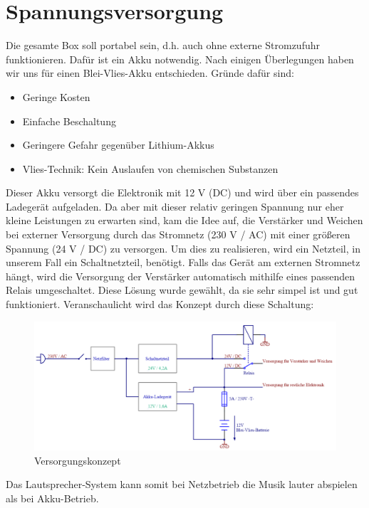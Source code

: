 \section{Spannungsversorgung}\label{sec:3.4}
Die gesamte Box soll portabel sein, d.h. auch ohne externe Stromzufuhr funktionieren.
Dafür ist ein Akku notwendig.
Nach einigen Überlegungen haben wir uns für einen Blei-Vlies-Akku entschieden.
Gründe dafür sind:
\begin{itemize}
	\item Geringe Kosten
	\item Einfache Beschaltung
	\item Geringere Gefahr gegenüber Lithium-Akkus
	\item Vlies-Technik: Kein Auslaufen von chemischen Substanzen
\end{itemize}
Dieser Akku versorgt die Elektronik mit 12 V (DC) und wird über ein passendes Ladegerät aufgeladen.
Da aber mit dieser relativ geringen Spannung nur eher kleine Leistungen zu erwarten sind, kam die Idee auf, die Verstärker und Weichen bei externer Versorgung durch das Stromnetz (230 V / AC) mit einer größeren Spannung (24 V / DC) zu versorgen.
Um dies zu realisieren, wird ein Netzteil, in unserem Fall ein Schaltnetzteil, benötigt.
Falls das Gerät am externen Stromnetz hängt, wird die Versorgung der Verstärker automatisch mithilfe eines passenden Relais umgeschaltet.
Diese Lösung wurde gewählt, da sie sehr simpel ist und gut funktioniert.
Veranschaulicht wird das Konzept durch diese Schaltung:
\begin{figure} [H]
	\centering	
	\includegraphics[width=1\textwidth]{img/Grundlagen/VersorgungV2.png}
	\caption{Versorgungskonzept}
	\label {fig:3.4.1}
\end{figure}
Das Lautsprecher-System kann somit bei Netzbetrieb die Musik lauter abspielen als bei Akku-Betrieb.

